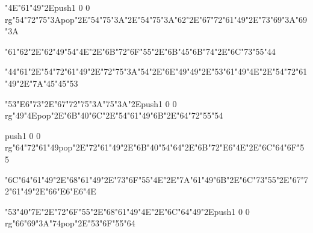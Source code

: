 \centerline{\ipa\char"4E\ipa\char"61\ipa\char"49\ipa\char"2E\pdfcolorstack\match push{1 0 0 rg}\ipa\char"54\ipa\char"72\ipa\char"75\ipa\char"3A\pdfcolorstack\match pop{}\ipa\char"2E\ipa\char"54\ipa\char"75\ipa\char"3A\ipa\char"2E\ipa\char"54\ipa\char"75\ipa\char"3A\ipa\char"62\ipa\char"2E\ipa\char"67\ipa\char"72\ipa\char"61\ipa\char"49\ipa\char"2E\ipa\char"73\ipa\char"69\ipa\char"3A\ipa\char"69\ipa\char"3A}
\vfill\eject
\null\vfill
\centerline{\ipa\char"61\ipa\char"62\ipa\char"2E\ipa\char"62\ipa\char"49\ipa\char"54\ipa\char"4E\ipa\char"2E\ipa\char"6B\ipa\char"72\ipa\char"6F\ipa\char"55\ipa\char"2E\ipa\char"6B\ipa\char"45\ipa\char"6B\ipa\char"74\ipa\char"2E\ipa\char"6C\ipa\char"73\ipa\char"55\ipa\char"44}\bigskip
\centerline{\ipa\char"44\ipa\char"61\ipa\char"2E\ipa\char"54\ipa\char"72\ipa\char"61\ipa\char"49\ipa\char"2E\ipa\char"72\ipa\char"75\ipa\char"3A\ipa\char"54\ipa\char"2E\ipa\char"6E\ipa\char"49\ipa\char"49\ipa\char"2E\ipa\char"53\ipa\char"61\ipa\char"49\ipa\char"4E\ipa\char"2E\ipa\char"54\ipa\char"72\ipa\char"61\ipa\char"49\ipa\char"2E\ipa\char"7A\ipa\char"45\ipa\char"45\ipa\char"53}\bigskip
\centerline{\ipa\char"53\ipa\char"E6\ipa\char"73\ipa\char"2E\ipa\char"67\ipa\char"72\ipa\char"75\ipa\char"3A\ipa\char"75\ipa\char"3A\ipa\char"2E\pdfcolorstack\match push{1 0 0 rg}\ipa\char"49\ipa\char"4E\pdfcolorstack\match pop{}\ipa\char"2E\ipa\char"6B\ipa\char"40\ipa\char"6C\ipa\char"2E\ipa\char"54\ipa\char"61\ipa\char"49\ipa\char"6B\ipa\char"2E\ipa\char"64\ipa\char"72\ipa\char"55\ipa\char"54}
\vfill\eject
\null\vfill
\centerline{\pdfcolorstack\match push{1 0 0 rg}\ipa\char"64\ipa\char"72\ipa\char"61\ipa\char"49\pdfcolorstack\match pop{}\ipa\char"2E\ipa\char"72\ipa\char"61\ipa\char"49\ipa\char"2E\ipa\char"6B\ipa\char"40\ipa\char"54\ipa\char"64\ipa\char"2E\ipa\char"6B\ipa\char"72\ipa\char"E6\ipa\char"4E\ipa\char"2E\ipa\char"6C\ipa\char"64\ipa\char"6F\ipa\char"55}\bigskip
\centerline{\ipa\char"6C\ipa\char"64\ipa\char"61\ipa\char"49\ipa\char"2E\ipa\char"68\ipa\char"61\ipa\char"49\ipa\char"2E\ipa\char"73\ipa\char"6F\ipa\char"55\ipa\char"4E\ipa\char"2E\ipa\char"7A\ipa\char"61\ipa\char"49\ipa\char"6B\ipa\char"2E\ipa\char"6C\ipa\char"73\ipa\char"55\ipa\char"2E\ipa\char"67\ipa\char"72\ipa\char"61\ipa\char"49\ipa\char"2E\ipa\char"66\ipa\char"E6\ipa\char"E6\ipa\char"4E}\bigskip
\centerline{\ipa\char"53\ipa\char"40\ipa\char"7E\ipa\char"2E\ipa\char"72\ipa\char"6F\ipa\char"55\ipa\char"2E\ipa\char"68\ipa\char"61\ipa\char"49\ipa\char"4E\ipa\char"2E\ipa\char"6C\ipa\char"64\ipa\char"49\ipa\char"2E\pdfcolorstack\match push{1 0 0 rg}\ipa\char"66\ipa\char"69\ipa\char"3A\ipa\char"74\pdfcolorstack\match pop{}\ipa\char"2E\ipa\char"53\ipa\char"6F\ipa\char"55\ipa\char"64}
